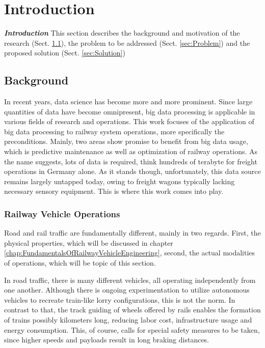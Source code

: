 \chapter{Introduction}
\label{chap:Introduction}
\par\noindent
\emph{\textbf{Introduction}} This section describes the background and motivation of the research (Sect. \ref{sec:Background}), the problem to be addressed (Sect. \ref{sec:Problem}) and the proposed solution (Sect. \ref{sec:Solution}) 

\section{Background}
\label{sec:Background}
\par\noindent
In recent years, data science has become more and more prominent. Since large quantities of data have become omnipresent, big data processing is applicable in various fields of research and operations. This work focuses of the application of big data processing to railway system operations, more specifically the preconditions. Mainly, two areas show promise to benefit from big data usage, which is predictive maintenance as well as optimization of railway operations. As the name suggests, lots of data is required, think hundreds of terabyte for freight operations in Germany alone. As it stands though, unfortunately, this data source remains largely untapped today, owing to freight wagons typically lacking necessary sensory equipment. This is where this work comes into play.

\subsection{Railway Vehicle Operations}
\label{sec:RailwayVehicleOperations}
\par\noindent
Road and rail traffic are fundamentally different, mainly in two regards. First, the physical properties, which will be discussed in chapter \ref{chap:FundamentalsOfRailwayVehicleEngineering}, second, the actual modalities of operations, which will be topic of this section.
\par
In road traffic, there is many different vehicles, all operating independently from one another. Although there is ongoing experimentation to utilize autonomous vehicles to recreate train-like lorry configurations, this is not the norm. In contrast to that, the track guiding of wheels offered by rails enables the formation of trains possibly kilometers long, reducing labor cost, infrastructure usage and energy consumption. This, of course, calls for special safety measures to be taken, since higher speeds and payloads result in long braking distances. 

